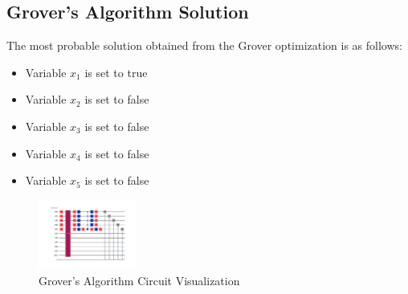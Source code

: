 \documentclass{article}%
\begin{document}
%
\subsection{Grover's Algorithm Solution}%
\label{subsec:GroversAlgorithmSolution}%
The most probable solution obtained from the Grover optimization is as follows:\newline%
%
\begin{itemize}%
\item Variable \( x_1 \) is set to true%
\item Variable \( x_2 \) is set to false%
\item Variable \( x_3 \) is set to false%
\item Variable \( x_4 \) is set to false%
\item Variable \( x_5 \) is set to false%
\end{itemize}

%


\begin{figure}[h!]%
\centering%
\includegraphics[width=120px]{quantum_circuit_grover.png}%
\caption{Grover's Algorithm Circuit Visualization}%
\end{figure}

%
\end{document}
